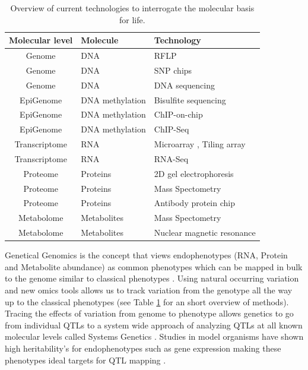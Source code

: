 \begin{table}[h]
  \centering
  {\footnotesize
  \begin{tabular}{ | c | l | l | }
    \hline
    {\bf Molecular level} & {\bf Molecule} & {\bf Technology}\\
    \hline
    \hline
\rowcolor{gray!35}    Genome          & DNA                & RFLP \cite{Lander:1986} \\
\rowcolor{gray!35}    Genome          & DNA                & SNP chips \cite{Hacia:1999} \\
\rowcolor{gray!35}    Genome          & DNA                & DNA sequencing \cite{Mardis:2008} \\
    \hline
    EpiGenome       & DNA methylation    & Bisulfite sequencing \cite{Hayatsu:2007} \\
    EpiGenome       & DNA methylation    & ChIP-on-chip \cite{Collas:2010} \\
    EpiGenome       & DNA methylation    & ChIP-Seq \cite{Park:2009} \\
    \hline
    \hline
\rowcolor{gray!35}    Transcriptome   & RNA          & Microarray \cite{Lashkari:1997}, Tiling array \cite{Lee:2013} \\
\rowcolor{gray!35}    Transcriptome   & RNA          & RNA-Seq \cite{Wang:2009}\\
    \hline
    Proteome        & Proteins     & 2D gel electrophoresis \cite{O'Farrell:1975}\\
    Proteome        & Proteins     & Mass Spectometry \cite{Deshaies:2001}\\
    Proteome        & Proteins     & Antibody protein chip \cite{Fasolo:2009} \\
    \hline
\rowcolor{gray!35}    Metabolome      & Metabolites  & Mass Spectometry \cite{Aebersold:2003} \\
\rowcolor{gray!35}    Metabolome      & Metabolites  & Nuclear magnetic resonance \cite{Espina:2009} \\
    \hline
  \end{tabular}
  }
  \caption[Overview]{Overview of current technologies to interrogate the molecular basis for life.}
    \label{tbl:overview}
\end{table}

Genetical Genomics is the concept that views endophenotypes (RNA, Protein and Metabolite abundance) 
as common phenotypes which can be mapped in bulk to the genome similar to classical 
phenotypes \cite{Jansen:2001a}. Using natural occurring variation and new omics tools allows us 
to track variation from the genotype all the way up to the classical phenotypes (see Table 
\ref{tbl:overview} for an short overview of methods). Tracing the effects of variation from 
genome to phenotype allows genetics to go from individual QTLs to a system wide approach of 
analyzing QTLs at all known molecular levels called Systems Genetics \cite{Threadgill:2006, Nadeau:2011}.
Studies in model organisms have shown high heritability's for endophenotypes such as gene 
expression making these phenotypes ideal targets for QTL mapping \cite{Brem:2002, Yvert:2003, Morley:2004}. 

